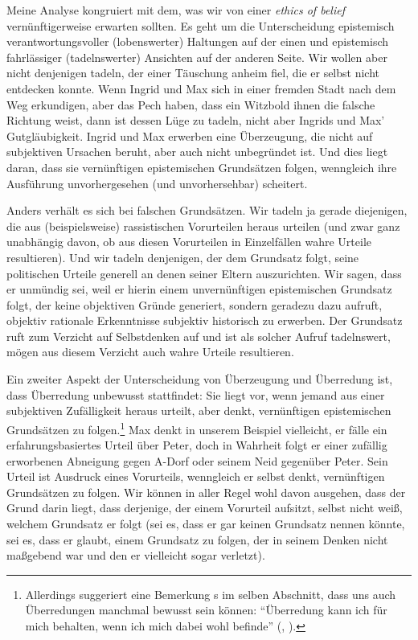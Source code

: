 Meine Analyse kongruiert mit dem, was wir von einer \emph{ethics of belief}
vernünftigerweise erwarten sollten. Es geht um die Unterscheidung epistemisch
verantwortungsvoller (lobenswerter) Haltungen auf der einen und epistemisch
fahrlässiger (tadelnswerter) Ansichten auf der anderen Seite. Wir wollen aber
nicht denjenigen tadeln, der einer Täuschung anheim fiel, die er selbst nicht
entdecken konnte. Wenn Ingrid und Max sich in einer fremden Stadt nach dem Weg
erkundigen, aber das Pech haben, dass ein Witzbold ihnen die falsche Richtung
weist, dann ist dessen Lüge zu tadeln, nicht aber Ingrids und Max'
Gutgläubigkeit. Ingrid und Max erwerben eine Überzeugung, die nicht auf
subjektiven Ursachen beruht, aber auch nicht unbegründet ist. Und dies liegt daran, dass sie
vernünftigen epistemischen Grundsätzen folgen, wenngleich ihre Ausführung
unvorhergesehen (und unvorhersehbar) scheitert.

Anders verhält es sich bei falschen Grundsätzen. Wir tadeln ja gerade
diejenigen, die aus (beispielsweise) rassistischen Vorurteilen heraus urteilen
(und zwar ganz unabhängig davon, ob aus diesen Vorurteilen in Einzelfällen wahre
Urteile resultieren). Und wir tadeln denjenigen, der dem Grundsatz folgt, seine
politischen Urteile generell an denen seiner Eltern auszurichten. Wir sagen,
dass er unmündig sei, weil er hierin einem unvernünftigen epistemischen
Grundsatz folgt, der keine objektiven Gründe generiert, sondern geradezu dazu
aufruft, objektiv rationale Erkenntnisse subjektiv historisch zu erwerben. Der
Grundsatz ruft zum Verzicht auf Selbstdenken auf und ist als solcher Aufruf
tadelnswert, mögen aus diesem Verzicht auch wahre Urteile resultieren.

Ein zweiter Aspekt der Unterscheidung von Überzeugung und Überredung ist, dass
Überredung unbewusst stattfindet: Sie liegt vor, wenn jemand aus einer
subjektiven Zufälligkeit heraus urteilt, aber denkt, vernünftigen epistemischen
Grundsätzen zu folgen.\footnote{Allerdings suggeriert eine Bemerkung
s im selben Abschnitt, dass uns auch Überredungen manchmal
bewusst sein können: \enquote{Überredung kann ich für mich behalten, wenn ich
mich dabei wohl befinde}
\mkbibparens{\cite[][B 850]{Kant:KritikderreinenVernunft2003},
\cite[][III: 532.33--34]{Kant:GesammelteWerke1900ff.}}.} Max denkt in unserem
Beispiel vielleicht, er fälle ein erfahrungsbasiertes Urteil über Peter, doch in
Wahrheit folgt er einer zufällig erworbenen Abneigung gegen A-Dorf oder seinem
Neid gegenüber Peter. Sein Urteil ist Ausdruck eines Vorurteils, wenngleich er
selbst denkt, vernünftigen Grundsätzen zu folgen. Wir können in aller Regel wohl
davon ausgehen, dass der Grund darin liegt, dass derjenige, der einem Vorurteil
aufsitzt, selbst nicht weiß, welchem Grundsatz er folgt (sei es, dass er gar
keinen Grundsatz nennen könnte, sei es, dass er glaubt, einem Grundsatz zu
folgen, der in seinem Denken nicht maßgebend war und den er vielleicht sogar
verletzt).

